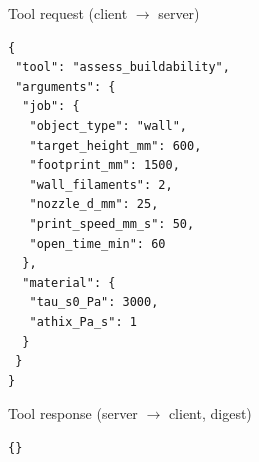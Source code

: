 \begin{mcpbox}{Tool request (client $\rightarrow$ server)}
\begin{lstlisting}[style=jsonstyle]
{
 "tool": "assess_buildability",
 "arguments": {
  "job": {
   "object_type": "wall",
   "target_height_mm": 600,
   "footprint_mm": 1500,
   "wall_filaments": 2,
   "nozzle_d_mm": 25,
   "print_speed_mm_s": 50,
   "open_time_min": 60
  },
  "material": {
   "tau_s0_Pa": 3000,
   "athix_Pa_s": 1
  }
 }
}
\end{lstlisting}
\end{mcpbox}
\begin{mcpbox}{Tool response (server $\rightarrow$ client, digest)}
\begin{lstlisting}[style=jsonstyle]
{}
\end{lstlisting}
\end{mcpbox}